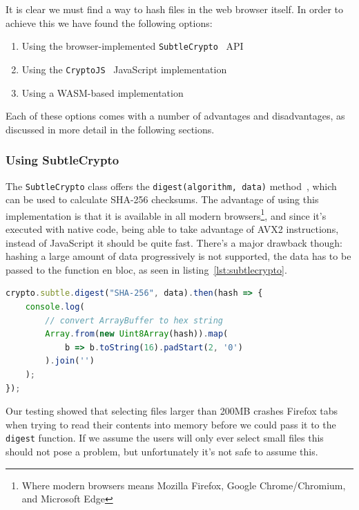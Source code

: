 It is clear we must find a way to hash files in the web browser itself.
In order to achieve this we have found the following options:

\begin{enumerate}
    \item Using the browser-implemented \texttt{SubtleCrypto}~\cite{subtlecrypto} \gls{API}
    \item Using the \texttt{CryptoJS}~\cite{cryptojs} JavaScript implementation
    \item Using a \gls{WASM}-based implementation
\end{enumerate}

Each of these options comes with a number of advantages and disadvantages, as discussed in more detail in the following sections.

\subsubsection{Using SubtleCrypto}
\label{subsubsec:subtlecrypto}
The \texttt{SubtleCrypto} class offers the \texttt{digest(algorithm, data)} method~\cite{subtlecrypto}, which can be used to
calculate \gls{SHA-256} checksums.
The advantage of using this implementation is that it is available in all modern browsers\footnote{Where modern browsers means Mozilla Firefox, Google Chrome/Chromium, and Microsoft Edge},
and since it's executed with native code, being able to take advantage of \gls{AVX2} instructions, instead of JavaScript it should be quite fast.
There's a major drawback though: hashing a large amount of data progressively is not supported, the data has to be
passed to the function en bloc, as seen in listing~\ref{lst:subtlecrypto}.

\begin{lstlisting}[caption={Using SubtleCrypto for calculating SHA-256 checksums}, captionpos=b, language=JavaScript, label={lst:subtlecrypto}]
crypto.subtle.digest("SHA-256", data).then(hash => {
    console.log(
        // convert ArrayBuffer to hex string
        Array.from(new Uint8Array(hash)).map(
            b => b.toString(16).padStart(2, '0')
        ).join('')
    );
});
\end{lstlisting}
Our testing showed that selecting files larger than 200MB crashes Firefox tabs when trying to read their contents
into memory before we could pass it to the \texttt{digest} function.
If we assume the users will only ever select small files this should not pose a problem, but unfortunately it's not safe to assume this.

